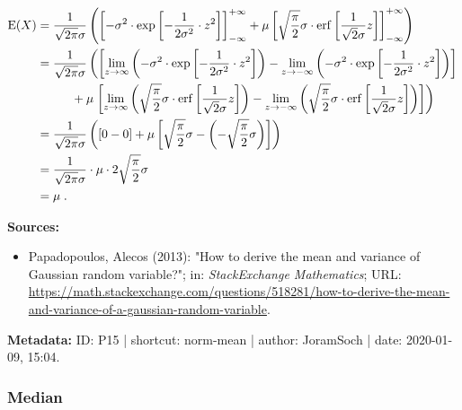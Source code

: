 \documentclass[a4paper,12pt]{book}
\begin{document}
\begin{equation} \label{eq:norm-mean-norm-mean-s3}
\begin{split}
\mathrm{E}(X) &= \frac{1}{\sqrt{2 \pi} \sigma} \left( \left[ -\sigma^2 \cdot \exp \left[ -\frac{1}{2 \sigma^2} \cdot z^2 \right] \right]_{-\infty}^{+\infty} + \mu \left[ \sqrt{\frac{\pi}{2}} \sigma \cdot \mathrm{erf} \left[ \frac{1}{\sqrt{2} \sigma} z \right] \right]_{-\infty}^{+\infty} \right) \\
&= \frac{1}{\sqrt{2 \pi} \sigma} \left( \left[ \lim_{z \to \infty} \left( -\sigma^2 \cdot \exp \left[ -\frac{1}{2 \sigma^2} \cdot z^2 \right] \right) - \lim_{z \to -\infty} \left( -\sigma^2 \cdot \exp \left[ -\frac{1}{2 \sigma^2} \cdot z^2 \right] \right) \right] \right. \\
&\hphantom{\sqrt{2 \pi}\sigma \;} + \mu \left. \left[ \lim_{z \to \infty} \left( \sqrt{\frac{\pi}{2}} \sigma \cdot \mathrm{erf} \left[ \frac{1}{\sqrt{2} \sigma} z \right] \right) - \lim_{z \to -\infty} \left( \sqrt{\frac{\pi}{2}} \sigma \cdot \mathrm{erf} \left[ \frac{1}{\sqrt{2} \sigma} z \right] \right) \right] \right) \\
&= \frac{1}{\sqrt{2 \pi} \sigma} \left( [0 - 0] + \mu \left[ \sqrt{\frac{\pi}{2}} \sigma - \left(- \sqrt{\frac{\pi}{2}} \sigma \right) \right] \right) \\
&= \frac{1}{\sqrt{2 \pi} \sigma} \cdot \mu \cdot 2 \sqrt{\frac{\pi}{2}} \sigma \\
&= \mu \; .
\end{split}
\end{equation}

\vspace{1em}
\textbf{Sources:}
\begin{itemize}
\item Papadopoulos, Alecos (2013): "How to derive the mean and variance of Gaussian random variable?"; in: \textit{StackExchange Mathematics}; URL: \url{https://math.stackexchange.com/questions/518281/how-to-derive-the-mean-and-variance-of-a-gaussian-random-variable}.
\end{itemize}


\vspace{1em}
\textbf{Metadata:} ID: P15 | shortcut: norm-mean | author: JoramSoch | date: 2020-01-09, 15:04.


\subsubsection[\textbf{Median}]{Median} \label{sec:norm-med}
\end{document}
